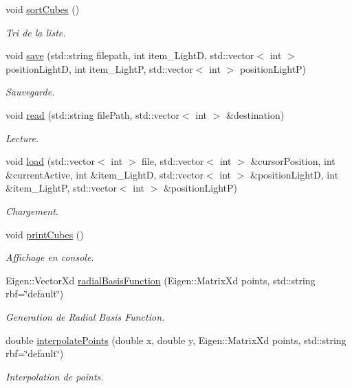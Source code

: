 \begin{DoxyCompactItemize}
void \hyperlink{classglimac_1_1CubeList_af6615c0db1a97fcae5df6f27de71b6d8}{sort\+Cubes} ()
\begin{DoxyCompactList}\small\item\em Tri de la liste. \end{DoxyCompactList}\item 
void \hyperlink{classglimac_1_1CubeList_a9e7ac57439f018d89b71c6071efd48e6}{save} (std\+::string filepath, int item\+\_\+\+LightD, std\+::vector$<$ int $>$ position\+LightD, int item\+\_\+\+LightP, std\+::vector$<$ int $>$ position\+LightP)
\begin{DoxyCompactList}\small\item\em Sauvegarde. \end{DoxyCompactList}\item 
void \hyperlink{classglimac_1_1CubeList_a59d87cac2e218d617940ccdab5235b31}{read} (std\+::string file\+Path, std\+::vector$<$ int $>$ \&destination)
\begin{DoxyCompactList}\small\item\em Lecture. \end{DoxyCompactList}\item 
void \hyperlink{classglimac_1_1CubeList_a6f615ea1238b29f8e19859b528ac6f26}{load} (std\+::vector$<$ int $>$ file, std\+::vector$<$ int $>$ \&cursor\+Position, int \&current\+Active, int \&item\+\_\+\+LightD, std\+::vector$<$ int $>$ \&position\+LightD, int \&item\+\_\+\+LightP, std\+::vector$<$ int $>$ \&position\+LightP)
\begin{DoxyCompactList}\small\item\em Chargement. \end{DoxyCompactList}\item 
void \hyperlink{classglimac_1_1CubeList_a5c3e997708642903eb6b4c806de0cdf9}{print\+Cubes} ()
\begin{DoxyCompactList}\small\item\em Affichage en console. \end{DoxyCompactList}\item 
Eigen\+::\+Vector\+Xd \hyperlink{classglimac_1_1CubeList_a365df432965d53d0ed146fd8bcc270cf}{radial\+Basis\+Function} (Eigen\+::\+Matrix\+Xd points, std\+::string rbf=\char`\"{}default\char`\"{})
\begin{DoxyCompactList}\small\item\em Generation de Radial Basis Function. \end{DoxyCompactList}\item 
double \hyperlink{classglimac_1_1CubeList_a183afd5d85506f957281c7092d5b5776}{interpolate\+Points} (double x, double y, Eigen\+::\+Matrix\+Xd points, std\+::string rbf=\char`\"{}default\char`\"{})
\begin{DoxyCompactList}\small\item\em Interpolation de points. \end{DoxyCompactList}\end{DoxyCompactItemize}


